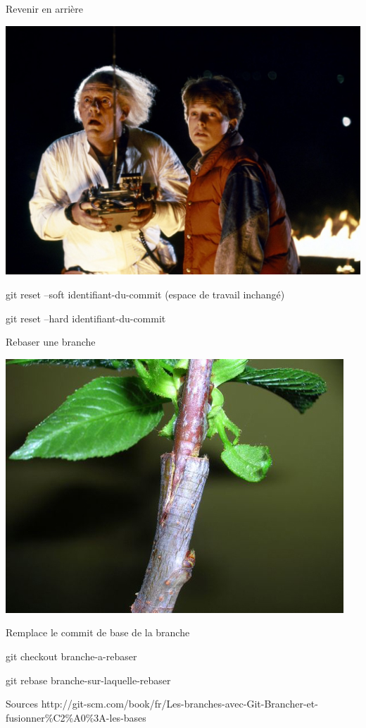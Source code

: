 \begin{frame}{Revenir en arrière}
\begin{center}
\includegraphics[scale=0.2]{retour-vers-le-futur-85-02-g.jpg}

git reset --soft identifiant-du-commit (espace de travail inchangé)

git reset --hard identifiant-du-commit
\end{center}
\end{frame}

\begin{frame}{Rebaser une branche}
\begin{center}
\includegraphics[scale=0.4]{greffe-00c1e2a50.jpg}

Remplace le commit de base de la branche

git checkout branche-a-rebaser

git rebase branche-sur-laquelle-rebaser
\end{center}
\end{frame}

\begin{frame}{Sources}
http://git-scm.com/book/fr/Les-branches-avec-Git-Brancher-et-fusionner\%C2\%A0\%3A-les-bases
\end{frame}
